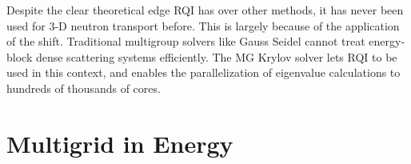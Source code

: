 Despite the clear theoretical edge RQI has over other methods, it has never been used for 3-D neutron transport before. This is largely because of the application of the shift. Traditional multigroup solvers like Gauss Seidel cannot treat energy-block dense scattering systems efficiently. The MG Krylov solver lets RQI to be used in this context, and enables the parallelization of eigenvalue calculations to hundreds of thousands of cores. 

\section{Multigrid in Energy}





